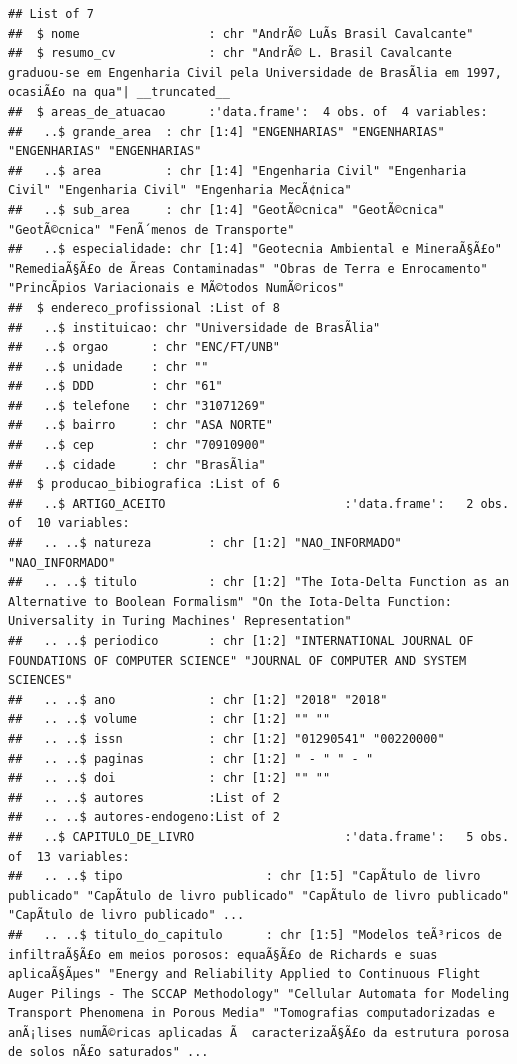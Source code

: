 \documentclass[]{article}
\begin{document}
\begin{verbatim}
## List of 7
##  $ nome                  : chr "AndrÃ© LuÃ­s Brasil Cavalcante"
##  $ resumo_cv             : chr "AndrÃ© L. Brasil Cavalcante graduou-se em Engenharia Civil pela Universidade de BrasÃ­lia em 1997, ocasiÃ£o na qua"| __truncated__
##  $ areas_de_atuacao      :'data.frame':  4 obs. of  4 variables:
##   ..$ grande_area  : chr [1:4] "ENGENHARIAS" "ENGENHARIAS" "ENGENHARIAS" "ENGENHARIAS"
##   ..$ area         : chr [1:4] "Engenharia Civil" "Engenharia Civil" "Engenharia Civil" "Engenharia MecÃ¢nica"
##   ..$ sub_area     : chr [1:4] "GeotÃ©cnica" "GeotÃ©cnica" "GeotÃ©cnica" "FenÃ´menos de Transporte"
##   ..$ especialidade: chr [1:4] "Geotecnia Ambiental e MineraÃ§Ã£o" "RemediaÃ§Ã£o de Ãreas Contaminadas" "Obras de Terra e Enrocamento" "PrincÃ­pios Variacionais e MÃ©todos NumÃ©ricos"
##  $ endereco_profissional :List of 8
##   ..$ instituicao: chr "Universidade de BrasÃ­lia"
##   ..$ orgao      : chr "ENC/FT/UNB"
##   ..$ unidade    : chr ""
##   ..$ DDD        : chr "61"
##   ..$ telefone   : chr "31071269"
##   ..$ bairro     : chr "ASA NORTE"
##   ..$ cep        : chr "70910900"
##   ..$ cidade     : chr "BrasÃ­lia"
##  $ producao_bibiografica :List of 6
##   ..$ ARTIGO_ACEITO                         :'data.frame':   2 obs. of  10 variables:
##   .. ..$ natureza        : chr [1:2] "NAO_INFORMADO" "NAO_INFORMADO"
##   .. ..$ titulo          : chr [1:2] "The Iota-Delta Function as an Alternative to Boolean Formalism" "On the Iota-Delta Function: Universality in Turing Machines' Representation"
##   .. ..$ periodico       : chr [1:2] "INTERNATIONAL JOURNAL OF FOUNDATIONS OF COMPUTER SCIENCE" "JOURNAL OF COMPUTER AND SYSTEM SCIENCES"
##   .. ..$ ano             : chr [1:2] "2018" "2018"
##   .. ..$ volume          : chr [1:2] "" ""
##   .. ..$ issn            : chr [1:2] "01290541" "00220000"
##   .. ..$ paginas         : chr [1:2] " - " " - "
##   .. ..$ doi             : chr [1:2] "" ""
##   .. ..$ autores         :List of 2
##   .. ..$ autores-endogeno:List of 2
##   ..$ CAPITULO_DE_LIVRO                     :'data.frame':   5 obs. of  13 variables:
##   .. ..$ tipo                    : chr [1:5] "CapÃ­tulo de livro publicado" "CapÃ­tulo de livro publicado" "CapÃ­tulo de livro publicado" "CapÃ­tulo de livro publicado" ...
##   .. ..$ titulo_do_capitulo      : chr [1:5] "Modelos teÃ³ricos de infiltraÃ§Ã£o em meios porosos: equaÃ§Ã£o de Richards e suas aplicaÃ§Ãµes" "Energy and Reliability Applied to Continuous Flight Auger Pilings - The SCCAP Methodology" "Cellular Automata for Modeling Transport Phenomena in Porous Media" "Tomografias computadorizadas e anÃ¡lises numÃ©ricas aplicadas Ã  caracterizaÃ§Ã£o da estrutura porosa de solos nÃ£o saturados" ...

\end{verbatim}
\end{document}
